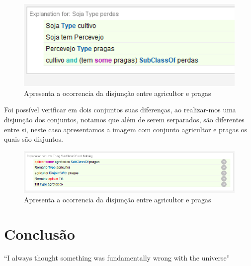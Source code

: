\documentclass{article}
\begin{document}
        \begin{figure}[!htp]
            \centering %
            \includegraphics[width=1\textwidth]{imagens/inferencia/inf_04_soja.PNG} %
            \caption{Apresenta a ocorrencia da disjunção entre agricultor e pragas}
            \label{figura:disjunt}
        \end{figure}
    
 

Foi possível verificar em dois conjuntos suas diferenças, ao realizar-mos uma 
disjunção dos conjuntos, notamos que além de serem serparados, são diferentes entre
si, neste caso apresentamos a imagem com conjunto agricultor e pragas os quais 
são disjuntos.


\begin{figure}[!htp]
    \centering %
    \includegraphics[width=1\textwidth]{imagens/disjunt.png} %
    \caption{Apresenta a ocorrencia da disjunção entre agricultor e pragas}
    \label{figura:disjunt}
\end{figure}

\section{Conclusão}
``I always thought something was fundamentally wrong with the universe'' \citep{adams1995hitchhiker}



\end{document}
